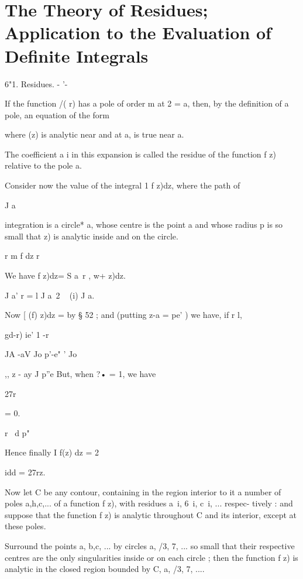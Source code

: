 \chapter{The Theory of Residues; Application to the Evaluation of Definite Integrals} 

6"1. Residues. - '-  

If the function /( r) has a pole of order m at 2 = a, then, by the definition 
of a pole, an equation of the form 

where   (z) is analytic near and at a, is true near a. 

The coefficient a i in this expansion is called the residue of the function 
f z) relative to the pole a. 

Consider now the value of the integral 1 f z)dz, where the path of 

J a 

integration is a circle* a, whose centre is the point a and whose radius p is so 
small that    z) is analytic inside and on the circle. 

r m f dz r 

We have f z)dz= S a\ r , w+   z)dz. 

J a' r = l J a\ 2 ~ (i) J a. 

Now [ (f) z)dz = by § 52 ; and (putting z-a = pe' ) we have, if r l, 

gd-r) ie' 
1 -r 



JA -aV Jo p'-e"  '  Jo 



,,  z - ay J p''e 
But, when ?• = 1, we have 



27r 

= 0. 





r \ d  p" 

Hence finally I f(z) dz = 2 



idd = 27rz. 



Now let C be any contour, containing in the region interior to it a number 
of poles a,h,c,... of a function f z), with residues a\ i, 6\ i, c\ i, ... respec- 
tively : and suppose that the function f z) is analytic throughout C and its 
interior, except at these poles. 

Surround the points a, b,c, ... by circles a, /3, 7, ... so small that their 
respective centres are the only singularities inside or on each circle ; then the 
function f z) is analytic in the closed region bounded by C, a, /3, 7, .... 

